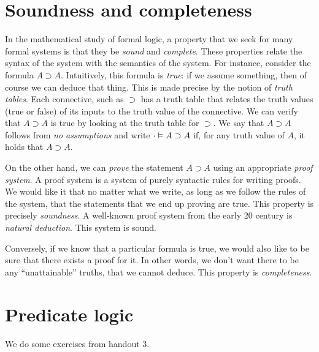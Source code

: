 \documentclass[11pt,letterpaper]{article}
\renewcommand{\implies}{\supset}
\begin{document}
\section{Soundness and completeness}

In the mathematical study of formal logic, a property that we seek for many
formal systems is that they be \emph{sound} and \emph{complete}.
These properties relate the syntax of the system with the semantics of the
system. For instance, consider the formula $A \implies A$.
Intuitively, this formula is \emph{true}: if we
assume something, then of course we can deduce that thing.
This is made precise by the notion of \emph{truth tables}.
Each connective, such as $\implies$ has a truth table that relates the truth
values (true or false) of its inputs to the truth value of the connective.
We can verify that $A \implies A$ is true by looking at the truth table for
$\implies$.
We say that $A \implies A$ follows from \emph{no assumptions} and write
$\cdot \entails A \implies A$ if, for any truth value of $A$,
it holds that $A \implies A$.

On the other hand, we can \emph{prove} the statement $A \implies A$ using an
appropriate \emph{proof system}. A proof system is a system of purely syntactic
rules for writing proofs.
We would like it that no matter what we write, as long as we follow the rules
of the system, that the statements that we end up proving are true. This
property is precisely \emph{soundness}.
A well-known proof system from the early 20\th{} century is \emph{natural
deduction}. This system is sound.

Conversely, if we know that a particular formula is true, we would also like to
be sure that there exists a proof for it. In other words, we don't want there
to be any ``unattainable'' truths, that we cannot deduce. This property is
\emph{completeness}.

\section{Predicate logic}

We do some exercises from handout 3.
\end{document}
